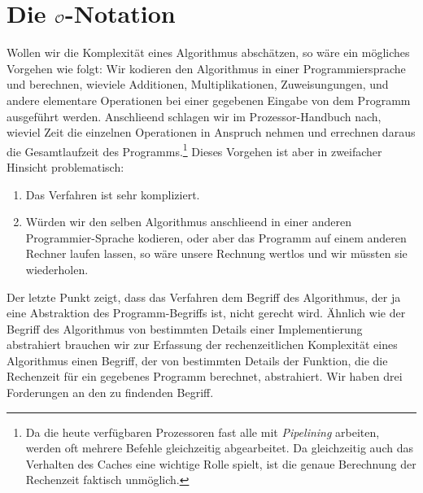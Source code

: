 \section{Die $\mathcal{O}$-Notation}
Wollen wir die Komplexit\"at eines Algorithmus absch\"atzen, so w\"are ein m\"ogliches Vorgehen
wie folgt: Wir kodieren den Algorithmus in einer Programmiersprache und berechnen,
wieviele Additionen, Multiplikationen, Zuweisungungen, und andere elementare Operationen
bei einer gegebenen Eingabe von dem Programm ausgef\"uhrt werden. Anschlie\3end schlagen wir
im Prozessor-Handbuch nach, wieviel Zeit die einzelnen Operationen in Anspruch nehmen und
errechnen daraus die Gesamtlaufzeit des Programms.\footnote{
Da die heute verf\"ugbaren Prozessoren fast alle mit \emph{Pipelining} arbeiten, werden oft
mehrere Befehle gleichzeitig abgearbeitet. Da gleichzeitig auch das Verhalten des Caches
eine wichtige Rolle spielt, ist die genaue Berechnung der Rechenzeit faktisch unm\"oglich.}
Dieses Vorgehen ist aber in zweifacher Hinsicht problematisch:
\begin{enumerate}
\item Das Verfahren ist sehr kompliziert.
\item W\"urden wir den selben Algorithmus anschlie\3end in einer anderen Programmier-Sprache
      kodieren, oder aber das Programm auf einem anderen Rechner laufen lassen, so w\"are
      unsere Rechnung wertlos und wir m\"ussten sie wiederholen.
\end{enumerate}
Der letzte Punkt zeigt, dass das Verfahren dem Begriff des Algorithmus, der ja eine
Abstraktion des Programm-Begriffs ist, nicht gerecht wird.  \"Ahnlich wie der Begriff des
Algorithmus von bestimmten Details einer Implementierung abstrahiert brauchen wir zur
Erfassung der rechenzeitlichen Komplexit\"at eines Algorithmus einen Begriff, der von
bestimmten Details der Funktion, die die Rechenzeit f\"ur ein gegebenes Programm berechnet,
abstrahiert.  Wir haben drei Forderungen an den zu findenden  Begriff.
